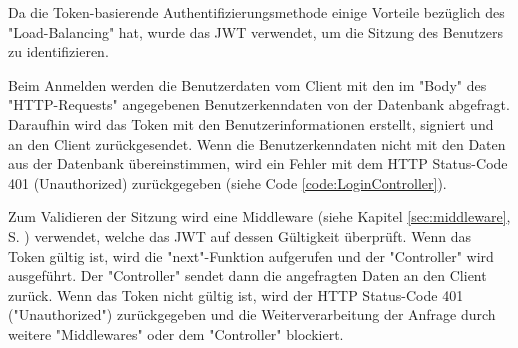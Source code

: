 
Da die Token-basierende Authentifizierungsmethode einige Vorteile bezüglich des "Load-Balancing" hat, wurde das JWT verwendet, um die Sitzung des Benutzers zu identifizieren.



Beim Anmelden werden die Benutzerdaten vom Client mit den im "Body" des "HTTP-Requests" angegebenen Benutzerkenndaten von der Datenbank abgefragt. 
Daraufhin wird das Token mit den Benutzerinformationen erstellt, signiert und an den Client zurückgesendet. 
Wenn die Benutzerkenndaten nicht mit den Daten aus der Datenbank übereinstimmen, wird ein Fehler mit dem HTTP Status-Code 401 (Unauthorized) zurückgegeben (siehe Code \ref{code:LoginController}).


\pagebreak
{}

Zum Validieren der Sitzung wird eine Middleware (siehe Kapitel \ref{sec:middleware}, S. \pageref{sec:middleware}) verwendet, welche das JWT auf dessen Gültigkeit überprüft. 
Wenn das Token gültig ist, wird die "next"-Funktion aufgerufen und der "Controller" wird ausgeführt. Der "Controller" sendet dann die angefragten Daten an den Client zurück. 
Wenn das Token nicht gültig ist, wird der HTTP Status-Code 401 ("Unauthorized") zurückgegeben und die Weiterverarbeitung der Anfrage durch weitere "Middlewares" oder dem "Controller" blockiert.

